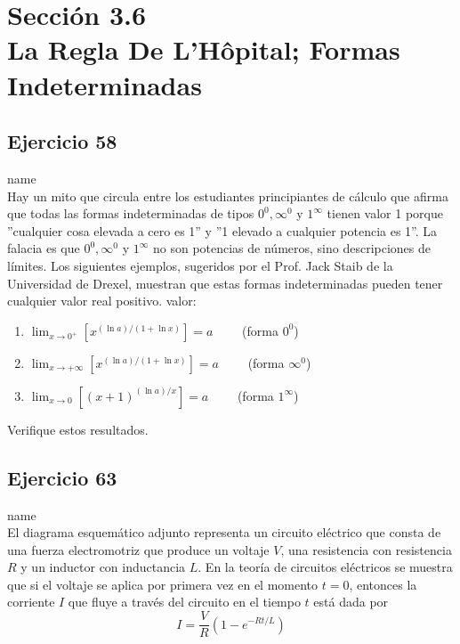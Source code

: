 \documentclass[12pt]{article}
\begin{document}
\section{Sección 3.6 \\ La Regla De L'Hôpital; Formas Indeterminadas} 
\subsection{Ejercicio 58} name \\

Hay un mito que circula entre los estudiantes principiantes de cálculo que afirma que todas las formas indeterminadas de tipos $0^0,\infty^0$ y $1^{\infty}$ tienen valor 1 porque ''cualquier cosa elevada a cero es 1'' y ''1 elevado a cualquier potencia es 1''. La falacia es que $0^0,\infty^0$ y $1^{\infty}$ no son potencias de números, sino descripciones de límites. Los siguientes ejemplos, sugeridos por el Prof. Jack Staib de la Universidad de Drexel, muestran que estas formas indeterminadas pueden tener cualquier valor real positivo.
valor:
\begin{enumerate}[label=(\alph*)]
\item $\lim_{x \to 0^+} [x^{(\ln a)/(1+\ln x)}]=a \qquad$ (forma $0^0$)
\item $\lim_{x \to +\infty} [x^{(\ln a)/(1+\ln x)}]=a \qquad$ (forma $\infty^0$)
\item $\lim_{x \to 0} [(x+1)^{(\ln a)/x}]=a \qquad$ (forma $1^{\infty}$)
\end{enumerate}
Verifique estos resultados.

\subsection{Ejercicio 63} name \\

El diagrama esquemático adjunto representa un circuito eléctrico que consta de una fuerza electromotriz que produce un voltaje $V$, una resistencia con resistencia $R$ y un inductor con inductancia $L$. En la teoría de circuitos eléctricos se muestra que si el voltaje se aplica por primera vez en el momento $t = 0$, entonces la corriente $I$ que fluye a través del circuito en el tiempo $t$ está dada por
\[
I=\frac{V}{R}\left(1-e^{-Rt/L}\right)
\]
\end{document}
